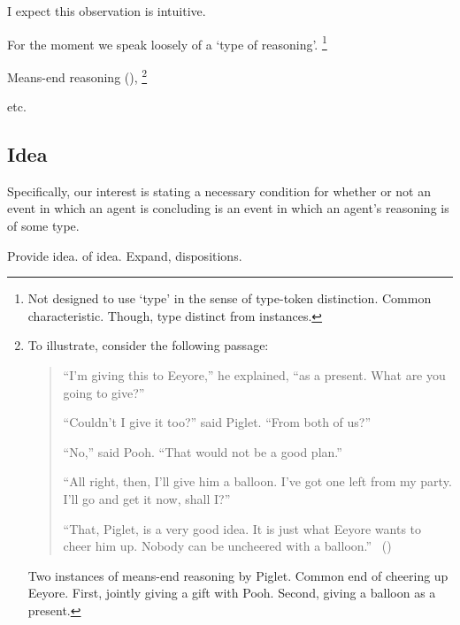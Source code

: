 \begin{note}
  I expect this observation is intuitive.

  For the moment we speak loosely of a `type of reasoning'.%
  \footnote{
    Not designed to use `type' in the sense of type-token distinction.
    Common characteristic.
    Though, type distinct from instances.
  }

  Means-end reasoning (\cite[60]{Pollock:2002aa}),%
  \footnote{
    To illustrate, consider the following passage:
    \begin{quote}
    \indent ``I'm giving this to Eeyore,'' he explained, ``as a present.
    What are you going to give?''

    ``Couldn't I give it too?'' said Piglet.
    ``From both of us?''

    ``No,'' said Pooh.
    ``That would not be a good plan.''

    ``All right, then, I'll give him a balloon.
    I've got one left from my party.
    I'll go and get it now, shall I?''

    ``That, Piglet, is a very good idea.
    It is just what Eeyore wants to cheer him up.
    Nobody can be uncheered with a balloon.''%
    \mbox{ }\hfill\mbox{(\cite[78--79]{Milne:2009aa})}\newline
    \mbox{ }
  \end{quote}

  Two instances of means-end reasoning by Piglet.
  Common end of cheering up Eeyore.
  First, jointly giving a gift with Pooh.
  Second, giving a balloon as a present.
  }

  etc.
\end{note}

\subsection{Idea}
\label{sec:idea}

\begin{note}
  Specifically, our interest is stating a necessary condition for whether or not an event in which an agent is concluding is an event in which an agent's reasoning is of some type.

  Provide idea.
   of idea.
  Expand, dispositions.
\end{note}

